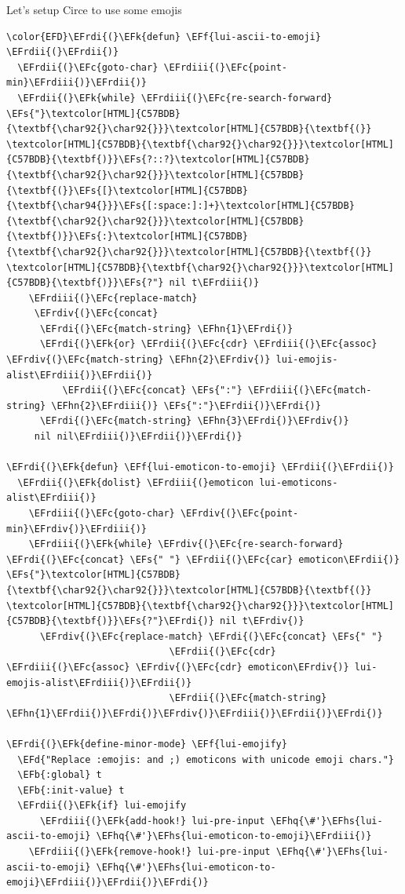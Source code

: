 \documentclass{scrartcl}
\newcommand{\EFk}[1]{\textcolor{EFk}{#1}} %
\newcommand{\EFd}[1]{\textcolor{EFd}{#1}} %
\newcommand{\EFs}[1]{\textcolor{EFs}{#1}} %
\newcommand{\EFb}[1]{\textcolor{EFb}{#1}} %
\newcommand{\EFc}[1]{\textcolor{EFc}{#1}} %
\newcommand{\EFf}[1]{\textcolor{EFf}{#1}} %
\newcommand{\EFhn}[1]{#1} %
\newcommand{\EFhq}[1]{#1} %
\newcommand{\EFhs}[1]{#1} %
\newcommand{\EFrdi}[1]{#1} %
\newcommand{\EFrdii}[1]{#1} %
\newcommand{\EFrdiii}[1]{#1} %
\newcommand{\EFrdiv}[1]{#1} %
\begin{document}
Let's setup Circe to use some emojis
\begin{Code}
\begin{Verbatim}[]
\color{EFD}\EFrdi{(}\EFk{defun} \EFf{lui-ascii-to-emoji} \EFrdii{(}\EFrdii{)}
  \EFrdii{(}\EFc{goto-char} \EFrdiii{(}\EFc{point-min}\EFrdiii{)}\EFrdii{)}
  \EFrdii{(}\EFk{while} \EFrdiii{(}\EFc{re-search-forward} \EFs{"}\textcolor[HTML]{C57BDB}{\textbf{\char92{}\char92{}}}\textcolor[HTML]{C57BDB}{\textbf{(}} \textcolor[HTML]{C57BDB}{\textbf{\char92{}\char92{}}}\textcolor[HTML]{C57BDB}{\textbf{)}}\EFs{?::?}\textcolor[HTML]{C57BDB}{\textbf{\char92{}\char92{}}}\textcolor[HTML]{C57BDB}{\textbf{(}}\EFs{[}\textcolor[HTML]{C57BDB}{\textbf{\char94{}}}\EFs{[:space:]:]+}\textcolor[HTML]{C57BDB}{\textbf{\char92{}\char92{}}}\textcolor[HTML]{C57BDB}{\textbf{)}}\EFs{:}\textcolor[HTML]{C57BDB}{\textbf{\char92{}\char92{}}}\textcolor[HTML]{C57BDB}{\textbf{(}} \textcolor[HTML]{C57BDB}{\textbf{\char92{}\char92{}}}\textcolor[HTML]{C57BDB}{\textbf{)}}\EFs{?"} nil t\EFrdiii{)}
    \EFrdiii{(}\EFc{replace-match}
     \EFrdiv{(}\EFc{concat}
      \EFrdi{(}\EFc{match-string} \EFhn{1}\EFrdi{)}
      \EFrdi{(}\EFk{or} \EFrdii{(}\EFc{cdr} \EFrdiii{(}\EFc{assoc} \EFrdiv{(}\EFc{match-string} \EFhn{2}\EFrdiv{)} lui-emojis-alist\EFrdiii{)}\EFrdii{)}
          \EFrdii{(}\EFc{concat} \EFs{":"} \EFrdiii{(}\EFc{match-string} \EFhn{2}\EFrdiii{)} \EFs{":"}\EFrdii{)}\EFrdi{)}
      \EFrdi{(}\EFc{match-string} \EFhn{3}\EFrdi{)}\EFrdiv{)}
     nil nil\EFrdiii{)}\EFrdii{)}\EFrdi{)}

\EFrdi{(}\EFk{defun} \EFf{lui-emoticon-to-emoji} \EFrdii{(}\EFrdii{)}
  \EFrdii{(}\EFk{dolist} \EFrdiii{(}emoticon lui-emoticons-alist\EFrdiii{)}
    \EFrdiii{(}\EFc{goto-char} \EFrdiv{(}\EFc{point-min}\EFrdiv{)}\EFrdiii{)}
    \EFrdiii{(}\EFk{while} \EFrdiv{(}\EFc{re-search-forward} \EFrdi{(}\EFc{concat} \EFs{" "} \EFrdii{(}\EFc{car} emoticon\EFrdii{)} \EFs{"}\textcolor[HTML]{C57BDB}{\textbf{\char92{}\char92{}}}\textcolor[HTML]{C57BDB}{\textbf{(}} \textcolor[HTML]{C57BDB}{\textbf{\char92{}\char92{}}}\textcolor[HTML]{C57BDB}{\textbf{)}}\EFs{?"}\EFrdi{)} nil t\EFrdiv{)}
      \EFrdiv{(}\EFc{replace-match} \EFrdi{(}\EFc{concat} \EFs{" "}
                             \EFrdii{(}\EFc{cdr} \EFrdiii{(}\EFc{assoc} \EFrdiv{(}\EFc{cdr} emoticon\EFrdiv{)} lui-emojis-alist\EFrdiii{)}\EFrdii{)}
                             \EFrdii{(}\EFc{match-string} \EFhn{1}\EFrdii{)}\EFrdi{)}\EFrdiv{)}\EFrdiii{)}\EFrdii{)}\EFrdi{)}

\EFrdi{(}\EFk{define-minor-mode} \EFf{lui-emojify}
  \EFd{"Replace :emojis: and ;) emoticons with unicode emoji chars."}
  \EFb{:global} t
  \EFb{:init-value} t
  \EFrdii{(}\EFk{if} lui-emojify
      \EFrdiii{(}\EFk{add-hook!} lui-pre-input \EFhq{\#'}\EFhs{lui-ascii-to-emoji} \EFhq{\#'}\EFhs{lui-emoticon-to-emoji}\EFrdiii{)}
    \EFrdiii{(}\EFk{remove-hook!} lui-pre-input \EFhq{\#'}\EFhs{lui-ascii-to-emoji} \EFhq{\#'}\EFhs{lui-emoticon-to-emoji}\EFrdiii{)}\EFrdii{)}\EFrdi{)}
\end{Verbatim}
\end{Code}
\end{document}
